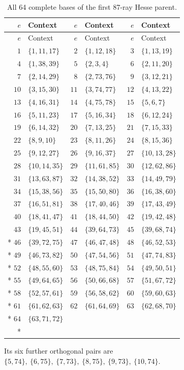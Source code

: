 \documentclass[aps,pra,reprint,superscriptaddress,longbibliography,nofootinbib,floatfix,10pt]{revtex4-2}
\theoremstyle{definition}
\begin{document}
\begin{longtable}{rlrlrl}
\caption{All 64 complete bases of the first 87-ray Hesse parent.}\label{tab:hesse87-contexts}\\
\toprule
$e$ & Context & $e$ & Context & $e$ & Context\\\midrule
\endfirsthead
\toprule
$e$ & Context & $e$ & Context & $e$ & Context\\\midrule
\endhead
\bottomrule\endfoot
$1$ & $\{1,11,17\}$ & $2$ & $\{1,12,18\}$ & $3$ & $\{1,13,19\}$\\
$4$ & $\{1,38,39\}$ & $5$ & $\{2,3,4\}$ & $6$ & $\{2,11,20\}$\\
$7$ & $\{2,14,29\}$ & $8$ & $\{2,73,76\}$ & $9$ & $\{3,12,21\}$\\
$10$ & $\{3,15,30\}$ & $11$ & $\{3,74,77\}$ & $12$ & $\{4,13,22\}$\\
$13$ & $\{4,16,31\}$ & $14$ & $\{4,75,78\}$ & $15$ & $\{5,6,7\}$\\
$16$ & $\{5,11,23\}$ & $17$ & $\{5,16,34\}$ & $18$ & $\{6,12,24\}$\\
$19$ & $\{6,14,32\}$ & $20$ & $\{7,13,25\}$ & $21$ & $\{7,15,33\}$\\
$22$ & $\{8,9,10\}$ & $23$ & $\{8,11,26\}$ & $24$ & $\{8,15,36\}$\\
$25$ & $\{9,12,27\}$ & $26$ & $\{9,16,37\}$ & $27$ & $\{10,13,28\}$\\
$28$ & $\{10,14,35\}$ & $29$ & $\{11,61,85\}$ & $30$ & $\{12,62,86\}$\\
$31$ & $\{13,63,87\}$ & $32$ & $\{14,38,52\}$ & $33$ & $\{14,49,79\}$\\
$34$ & $\{15,38,56\}$ & $35$ & $\{15,50,80\}$ & $36$ & $\{16,38,60\}$\\
$37$ & $\{16,51,81\}$ & $38$ & $\{17,40,46\}$ & $39$ & $\{17,43,49\}$\\
$40$ & $\{18,41,47\}$ & $41$ & $\{18,44,50\}$ & $42$ & $\{19,42,48\}$\\
$43$ & $\{19,45,51\}$ & $44$ & $\{39,64,73\}$ & $45$ & $\{39,68,74\}$\\*
$46$ & $\{39,72,75\}$ & $47$ & $\{46,47,48\}$ & $48$ & $\{46,52,53\}$\\*
$49$ & $\{46,73,82\}$ & $50$ & $\{47,54,56\}$ & $51$ & $\{47,74,83\}$\\*
$52$ & $\{48,55,60\}$ & $53$ & $\{48,75,84\}$ & $54$ & $\{49,50,51\}$\\*
$55$ & $\{49,64,65\}$ & $56$ & $\{50,66,68\}$ & $57$ & $\{51,67,72\}$\\*
$58$ & $\{52,57,61\}$ & $59$ & $\{56,58,62\}$ & $60$ & $\{59,60,63\}$\\*
$61$ & $\{61,62,63\}$ & $62$ & $\{61,64,69\}$ & $63$ & $\{62,68,70\}$\\*
$64$ & $\{63,71,72\}$ &  &  &  & \\*
\end{longtable}
\endgroup
Its six further orthogonal pairs are $\{5,74\},\ \{6,75\},\ \{7,73\},\ \{8,75\},\ \{9,73\},\ \{10,74\}$.
\end{document}
